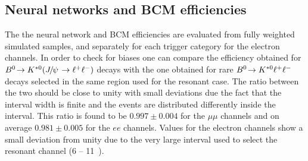 \subsection{Neural networks and BCM efficiencies}
\label{sec:Rkst_mva_eff}

The the neural network and BCM efficiencies are evaluated from fully weighted simulated samples,
and separately for each trigger category for the electron channels.
%
In order to check for biases one can compare the efficiency obtained for
\mbox{$\decay{\Bz}{\Kstarz(\jpsi\to\ll)}$} decays with the one obtained for rare ${{B}^0}\!\rightarrow {\ensuremath{{K}^{*0}}} \ell^+ \ell^-$ decays
selected in the same \qsq region used for the resonant case. The ratio between the two should
be close to unity with small deviations due the fact that the \qsq interval width is finite and the events
are distributed differently inside the interval. This ratio is found to be $ 0.997  \pm  0.004 $ for the
$\mu\mu$ channels and on average $0.981  \pm  0.005$ for the $ee$ channels.
Values for the electron channels show a small deviation from unity due to the very large
\qsq interval used to select the resonant channel (6 -- 11~\gevgevcccc).











